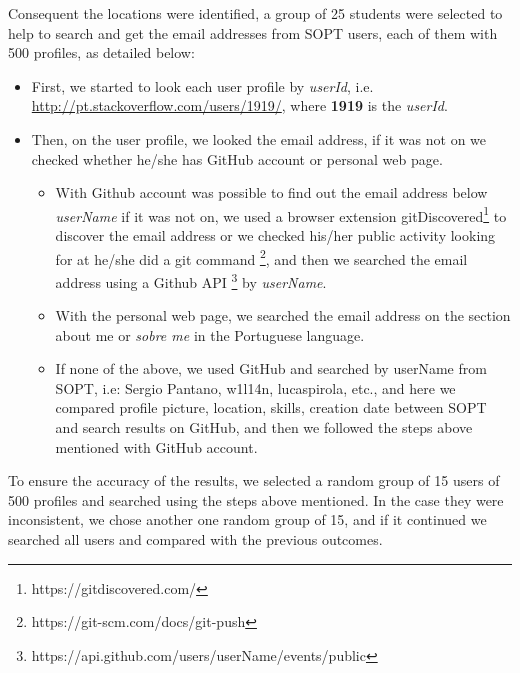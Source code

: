 Consequent the locations were identified, a group of 25 students  were selected to help to search and get the email addresses from SOPT users, each of them with 500 profiles, as detailed below:
\begin{itemize}
    \item First, we started to look each user profile by \textit{userId}, i.e. \url{http://pt.stackoverflow.com/users/1919/}, where \textbf{1919} is the \textit{userId}.
    \item Then, on the user profile, we looked the email address, if it was not on we checked whether he/she has GitHub account or personal web page. 
        \begin{itemize}
            \item With Github account was possible to find out the email address below \textit{userName} if it was not on, we used a browser extension gitDiscovered\footnote{https://gitdiscovered.com/} to discover the email address or we checked his/her public activity looking for at he/she did a git command \footnote{https://git-scm.com/docs/git-push}, and then we searched the email address using a Github API \footnote{https://api.github.com/users/userName/events/public} by \textit{userName}.
            \item With the personal web page, we searched the email address on the section about me or \textit{sobre me} in the Portuguese language.
            \item If none of the above, we used GitHub and searched by userName from SOPT, i.e: Sergio Pantano, w1l14n, lucaspirola, etc., and here we compared profile picture, location, skills, creation date between SOPT and search results on GitHub, and then we followed the steps above mentioned with GitHub account.              
       \end{itemize}            
   \end{itemize} 
To ensure the accuracy of the results, we selected a random group of 15 users of 500 profiles and searched using the steps above mentioned. In the case they were inconsistent, we chose another one random group of 15, and if it continued we searched all users and compared with the previous outcomes.

